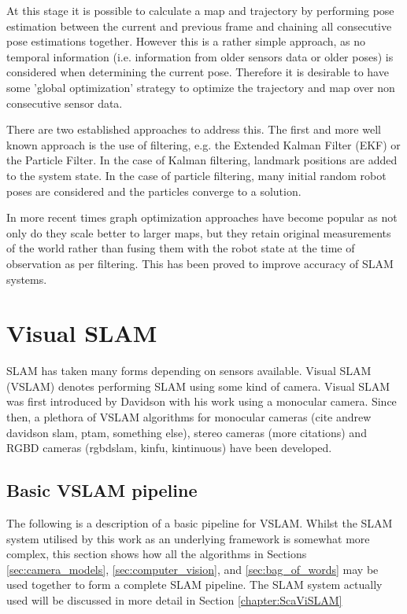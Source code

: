 At this stage it is possible to calculate a map and trajectory by performing pose estimation between the current and previous frame and chaining all consecutive pose estimations together.  However this is a rather simple approach, as no temporal information (i.e. information from older sensors data or older poses) is considered when determining the current pose.  Therefore it is desirable to have some 'global optimization' strategy to optimize the trajectory and map over non consecutive sensor data.

There are two established approaches to address this.  The first and more well known approach is the use of filtering, e.g. the Extended Kalman Filter (EKF) or the Particle Filter.  In the case of Kalman filtering, landmark positions are added to the system state.  In the case of particle filtering, many initial random robot poses are considered and the particles converge to a solution.

In more recent times graph optimization approaches have become popular as not only do they scale better to larger maps, but they retain original measurements of the world rather than fusing them with the robot state at the time of observation as per filtering.  This has been proved to improve accuracy of SLAM systems.

\section{Visual SLAM}

SLAM has taken many forms depending on sensors available. Visual SLAM (VSLAM) denotes performing SLAM using some kind of camera.  Visual SLAM was first introduced by Davidson with his work using a monocular camera.  Since then, a plethora of VSLAM algorithms for monocular cameras (cite andrew davidson slam, ptam, something else), stereo cameras (more citations) and RGBD cameras (rgbdslam, kinfu, kintinuous) have been developed.

\subsection{Basic VSLAM pipeline}

The following is a description of a basic pipeline for VSLAM.  Whilst the SLAM system utilised by this work as an underlying framework is somewhat more complex, this section shows how all the algorithms in Sections \ref{sec:camera_models}, \ref{sec:computer_vision}, and \ref{sec:bag_of_words} may be used together to form a complete SLAM pipeline.  The SLAM system actually used will be discussed in more detail in Section \ref{chapter:ScaViSLAM}

